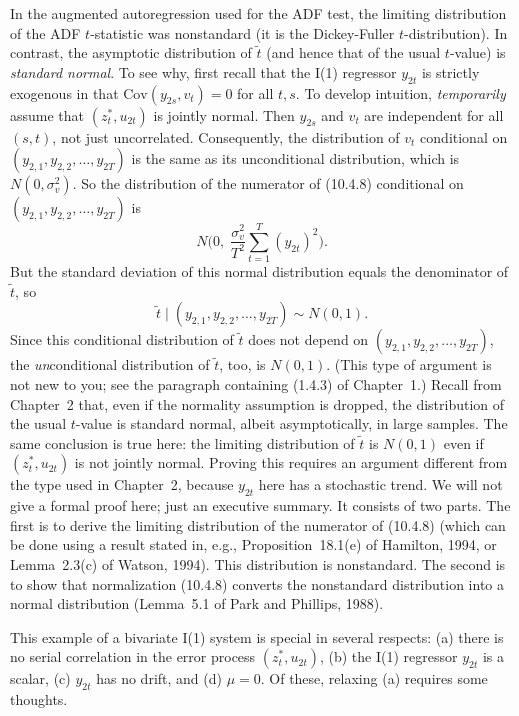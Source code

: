 In the augmented autoregression used for the ADF test, the limiting distribu\-tion
of the ADF $t$-statistic was nonstandard (it is the Dickey-Fuller $t$-distribution).
In contrast, the asymptotic distribution of $\tilde{t}$ (and hence that of the usual $t$-value)
is \emph{standard normal}. To see why, first recall that the I(1) regressor $y_{2t}$ is strictly
exogenous in that $\text{Cov}(y_{2s}, v_t) = 0$ for all $t, s$. To develop intuition, \emph{temporar\-ily}
assume that $(z_t^*, u_{2t})$ is jointly normal. Then $y_{2s}$ and $v_t$ are independent for
all $(s, t)$, not just uncorrelated. Consequently, the distribution of $v_t$ conditional on
$(y_{2,1}, y_{2,2}, \ldots, y_{2T})$ is the same as its unconditional distribution, which is $N(0, \sigma_v^2)$.
So the distribution of the numerator of (10.4.8) conditional on $(y_{2,1}, y_{2,2}, \ldots,
y_{2T})$ is
\[
  N\biggl(0, \; \frac{\sigma_v^2}{T^2} \sum_{t=1}^{T} (y_{2t})^2\biggr).
\]
But the standard deviation of this normal distribution equals the denominator of
$\tilde{t}$, so
\[
  \tilde{t} \mid (y_{2,1}, y_{2,2}, \ldots, y_{2T}) \sim N(0, 1).
\]
Since this conditional distribution of $\tilde{t}$ does not depend on $(y_{2,1}, y_{2,2}, \ldots, y_{2T})$, the
\emph{un}conditional distribution of $\tilde{t}$, too, is $N(0, 1)$. (This type of argument is not new to
you; see the paragraph containing (1.4.3) of Chapter~1.) Recall from Chapter~2 that,
even if the normality assumption is dropped, the distribution of the usual $t$-value
is standard normal, albeit asymptotically, in large samples. The same conclusion
is true here: the limiting distribution of $\tilde{t}$ is $N(0, 1)$ even if $(z_t^*, u_{2t})$ is not jointly
normal. Proving this requires an argument different from the type used in Chapter~2,
because $y_{2t}$ here has a stochastic trend. We will not give a formal proof here; just
an executive summary. It consists of two parts. The first is to derive the limiting
distribution of the numerator of (10.4.8) (which can be done using a result stated
in, e.g., Proposition~18.1(e) of Hamilton, 1994, or Lemma~2.3(c) of Watson, 1994).
This distribution is nonstandard. The second is to show that normalization (10.4.8)
converts the nonstandard distribution into a normal distribution (Lemma~5.1 of Park
and Phillips, 1988).

This example of a bivariate I(1) system is special in several respects: (a) there
is no serial correlation in the error process $(z_t^*, u_{2t})$, (b) the I(1) regressor $y_{2t}$ is a
scalar, (c) $y_{2t}$ has no drift, and (d) $\mu = 0$. Of these, relaxing (a) requires some
thoughts.


